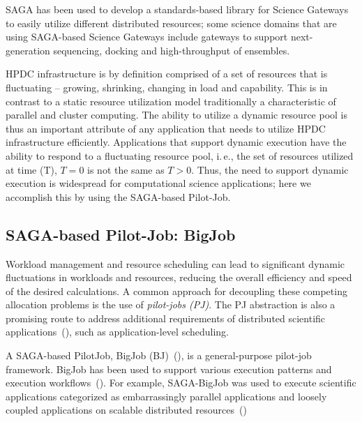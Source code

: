 \documentclass{sig-alternate}
\begin{document}
SAGA has been used to develop a standards-based library for Science
Gateways to easily utilize different distributed resources; some
science domains that are using SAGA-based Science Gateways include
gateways to support next-generation sequencing, docking and
high-throughput of ensembles.

HPDC infrastructure is by definition comprised of a set of resources
that is fluctuating -- growing, shrinking, changing in load and
capability. This is in contrast to a static resource utilization model
traditionally a characteristic of parallel and cluster computing. The
ability to utilize a dynamic resource pool is thus an important
attribute of any application that needs to utilize HPDC infrastructure
efficiently. Applications that support dynamic execution have the
ability to respond to a fluctuating resource pool, i.\,e., the set of
resources utilized at time (T), $T=0$ is not the same as $T>0$.  Thus,
the need to support dynamic execution is widespread for computational
science applications; here we accomplish this by using the SAGA-based
Pilot-Job.

\subsection{SAGA-based Pilot-Job: BigJob}

Workload management and resource scheduling can lead to significant dynamic 
fluctuations in workloads and resources, reducing the overall efficiency
and speed of the desired calculations. 
A common approach for decoupling  
these competing allocation problems is the use of \emph{pilot-jobs (PJ)}. 
 The  PJ
abstraction is also a promising route to address additional requirements of
distributed scientific applications~(\cite{ko-efficient,bigjob_cloudcom10}),
such
 as application-level scheduling.

A SAGA-based PilotJob, BigJob (BJ)~(\cite{bigjob_web,saga_bigjob_condor_cloud}),
is a general-purpose pilot-job framework. BigJob has been used to support
various execution patterns and execution
workflows~(\cite{async_repex11,repex_ptrsa}). For example, SAGA-BigJob was used
to execute scientific applications categorized as embarrassingly parallel
applications and loosely coupled applications on scalable distributed
resources~(\cite{ecmls_ccpe10, dare-ecmls11})
\end{document}
